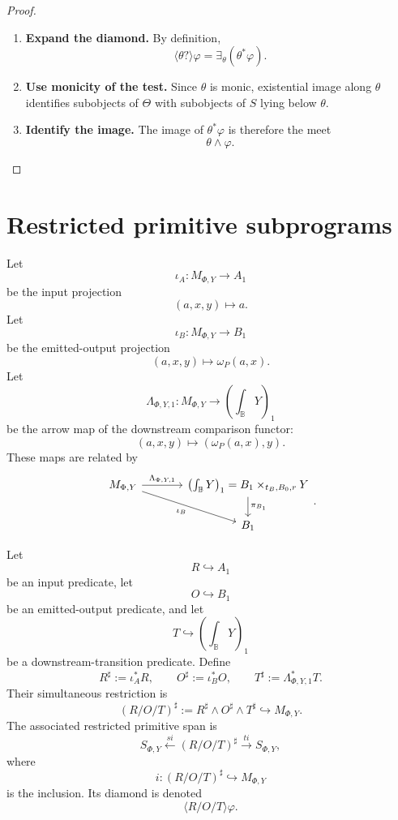 \begin{proof}
\leavevmode
\begin{enumerate}
\item \textbf{Expand the diamond.}
By definition,
\[
\langle\theta?\rangle\varphi
=
\exists_\theta(\theta^\ast\varphi).
\]

\item \textbf{Use monicity of the test.}
Since \(\theta\) is monic, existential image along \(\theta\) identifies
subobjects of \(\Theta\) with subobjects of \(S\) lying below \(\theta\).

\item \textbf{Identify the image.}
The image of \(\theta^\ast\varphi\) is therefore the meet
\[
\theta\wedge\varphi.
\]
\end{enumerate}
\end{proof}

\section{Restricted primitive subprograms}
\label{sec:relative-restricted-subprograms}

Let
\[
\iota_A:M_{\Phi,Y}\to A_1
\]
be the input projection
\[
(a,x,y)\mapsto a.
\]
Let
\[
\iota_B:M_{\Phi,Y}\to B_1
\]
be the emitted-output projection
\[
(a,x,y)\mapsto \omega_P(a,x).
\]
Let
\[
\Lambda_{\Phi,Y,1}:M_{\Phi,Y}\to
\left(\int_{\mathbb B}Y\right)_1
\]
be the arrow map of the downstream comparison functor:
\[
(a,x,y)\mapsto(\omega_P(a,x),y).
\]
These maps are related by
\[
\begin{tikzcd}[column sep=large]
M_{\Phi,Y}
\arrow[r,"\Lambda_{\Phi,Y,1}"]
\arrow[dr,"\iota_B"']
&
\left(\int_{\mathbb B}Y\right)_1
=
B_1\times_{t_B,B_0,r}Y
\arrow[d,"\pi_{B_1}"]
\\
&
B_1
\end{tikzcd}
.
\]

\begin{definition}
\label{def:relative-restricted-primitive-subprogram}
Let
\[
R\hookrightarrow A_1
\]
be an input predicate, let
\[
O\hookrightarrow B_1
\]
be an emitted-output predicate, and let
\[
T\hookrightarrow \left(\int_{\mathbb B}Y\right)_1
\]
be a downstream-transition predicate. Define
\[
R^\sharp:=\iota_A^\ast R,
\qquad
O^\sharp:=\iota_B^\ast O,
\qquad
T^\sharp:=\Lambda_{\Phi,Y,1}^\ast T.
\]
Their simultaneous restriction is
\[
(R/O/T)^\sharp
:=
R^\sharp\wedge O^\sharp\wedge T^\sharp
\hookrightarrow M_{\Phi,Y}.
\]
The associated restricted primitive span is
\[
S_{\Phi,Y}
\xleftarrow{s i}
(R/O/T)^\sharp
\xrightarrow{t i}
S_{\Phi,Y},
\]
where
\[
i:(R/O/T)^\sharp\hookrightarrow M_{\Phi,Y}
\]
is the inclusion. Its diamond is denoted
\[
\langle R/O/T\rangle\varphi.
\]
\end{definition}

